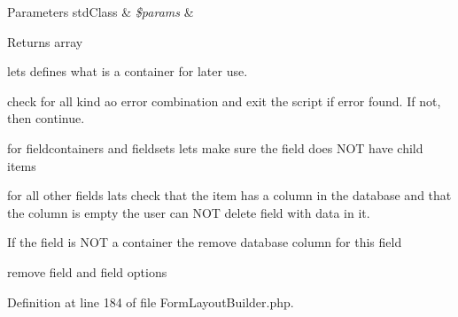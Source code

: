 \begin{DoxyParams}[1]{\-Parameters}
std\-Class & {\em \$params} & \\
\hline
\end{DoxyParams}
\begin{DoxyReturn}{\-Returns}
array 
\end{DoxyReturn}
lets defines what is a container for later use.

check for all kind ao error combination and exit the script if error found. \-If not, then continue.

for fieldcontainers and fieldsets lets make sure the field does \-N\-O\-T have child items

for all other fields lats check that the item has a column in the database and that the column is empty the user can \-N\-O\-T delete field with data in it.

\-If the field is \-N\-O\-T a container the remove database column for this field

remove field and field options

\-Definition at line 184 of file \-Form\-Layout\-Builder.\-php.



